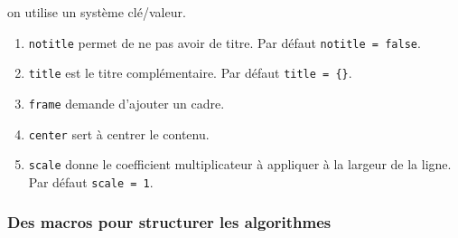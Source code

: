 \documentclass[12pt,a4paper]{article}
\theoremstyle{definition}
\newcommand\extraspace{
    \vspace{0.25em}
}
\begin{document}
\IDoption{} on utilise un système clé/valeur.
\begin{enumerate}
	\item \verb#notitle# permet de ne pas avoir de titre.
	      Par défaut \verb#notitle = false#.

	\item \verb#title# est le titre complémentaire.
	      Par défaut \verb#title = {}#.

	\item \verb#frame# demande d'ajouter un cadre.

	\item \verb#center# sert à centrer le contenu.

	\item \verb#scale# donne le coefficient multiplicateur à appliquer à la largeur de la ligne.
	      Par défaut \verb#scale = 1#.
\end{enumerate}

















\subsubsection{Des macros pour structurer les algorithmes}







\extraspace





\extraspace





\extraspace

\end{document}
